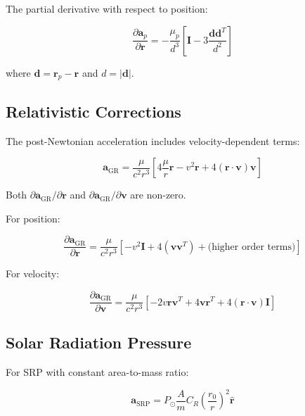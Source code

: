 The partial derivative with respect to position:

\begin{equation}
    \frac{\partial\mathbf{a}_p}{\partial\mathbf{r}} = -\frac{\mu_p}{d^3}\left[\mathbf{I} - 3\frac{\mathbf{d}\mathbf{d}^T}{d^2}\right]
\end{equation}

where $\mathbf{d} = \mathbf{r}_p - \mathbf{r}$ and $d = |\mathbf{d}|$.

\subsection{Relativistic Corrections}

The post-Newtonian acceleration includes velocity-dependent terms:

\begin{equation}
    \mathbf{a}_{\text{GR}} = \frac{\mu}{c^2 r^3}\left[4\frac{\mu}{r}\mathbf{r} - v^2\mathbf{r} + 4(\mathbf{r} \cdot \mathbf{v})\mathbf{v}\right]
\end{equation}

Both $\partial\mathbf{a}_{\text{GR}}/\partial\mathbf{r}$ and $\partial\mathbf{a}_{\text{GR}}/\partial\mathbf{v}$ are non-zero.

For position:

\begin{equation}
    \frac{\partial\mathbf{a}_{\text{GR}}}{\partial\mathbf{r}} = \frac{\mu}{c^2 r^3}\left[-v^2\mathbf{I} + 4(\mathbf{v}\mathbf{v}^T) + \text{(higher order terms)}\right]
\end{equation}

For velocity:

\begin{equation}
    \frac{\partial\mathbf{a}_{\text{GR}}}{\partial\mathbf{v}} = \frac{\mu}{c^2 r^3}\left[-2v\mathbf{r}\mathbf{v}^T + 4\mathbf{v}\mathbf{r}^T + 4(\mathbf{r} \cdot \mathbf{v})\mathbf{I}\right]
\end{equation}

\subsection{Solar Radiation Pressure}

For SRP with constant area-to-mass ratio:

\begin{equation}
    \mathbf{a}_{\text{SRP}} = P_\odot \frac{A}{m} C_R \left(\frac{r_0}{r}\right)^2 \hat{\mathbf{r}}
\end{equation}

